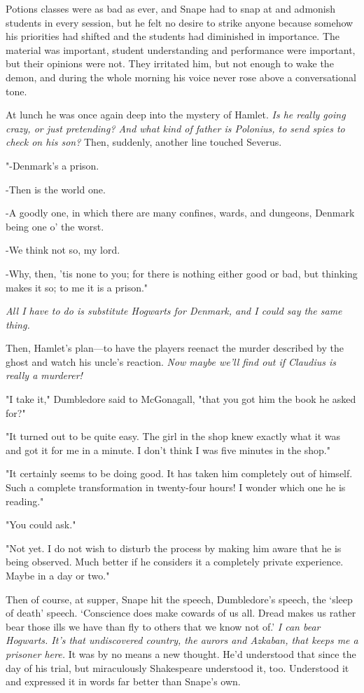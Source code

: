 Potions classes were as bad as ever, and Snape had to snap at and admonish students in every session, but he felt no desire to strike anyone because somehow his priorities had shifted and the students had diminished in importance. The material was important, student understanding and performance were important, but their opinions were not. They irritated him, but not enough to wake the demon, and during the whole morning his voice never rose above a conversational tone.

At lunch he was once again deep into the mystery of Hamlet. \emph{Is he really going crazy, or just pretending? And what kind of father is Polonius, to send spies to check on his son?} Then, suddenly, another line touched Severus.

"-Denmark's a prison.

-Then is the world one.

-A goodly one, in which there are many confines, wards, and dungeons, Denmark being one o' the worst.

-We think not so, my lord.

-Why, then, 'tis none to you; for there is nothing either good or bad, but thinking makes it so; to me it is a prison."

\emph{All I have to do is substitute Hogwarts for Denmark, and I could say the same thing.}

Then, Hamlet's plan—to have the players reenact the murder described by the ghost and watch his uncle's reaction. \emph{Now maybe we'll find out if Claudius is really a murderer!}

"I take it," Dumbledore said to McGonagall, "that you got him the book he asked for?"

"It turned out to be quite easy. The girl in the shop knew exactly what it was and got it for me in a minute. I don't think I was five minutes in the shop."

"It certainly seems to be doing good. It has taken him completely out of himself. Such a complete transformation in twenty-four hours! I wonder which one he is reading."

"You could ask."

"Not yet. I do not wish to disturb the process by making him aware that he is being observed. Much better if he considers it a completely private experience. Maybe in a day or two."

Then of course, at supper, Snape hit the speech, Dumbledore's speech, the `sleep of death' speech. `Conscience does make cowards of us all. Dread makes us rather bear those ills we have than fly to others that we know not of.' \emph{I can bear Hogwarts. It's that undiscovered country, the aurors and Azkaban, that keeps me a prisoner here.} It was by no means a new thought. He'd understood that since the day of his trial, but miraculously Shakespeare understood it, too. Understood it and expressed it in words far better than Snape's own.

